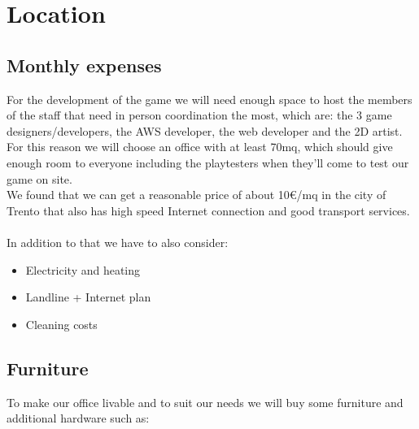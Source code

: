 \section{Location}
\label{section:location}

\subsection{Monthly expenses}
For the development of the game we will need enough space to host the members of the staff that need in person coordination the most, which are: the 3 game designers/developers, the AWS developer, the web developer and the 2D artist. For this reason we will choose an office with at least 70mq, which should give enough room to everyone including the playtesters when they'll come to test our game on site. \\
We found that we can get a reasonable price of about 10€/mq in the city of Trento that also has high speed Internet connection and good transport services. \\\\
In addition to that we have to also consider:
\begin{itemize}
	\item Electricity and heating
	\item Landline + Internet plan
	\item Cleaning costs
\end{itemize}


\subsection{Furniture}

To make our office livable and to suit our needs we will buy some furniture and additional hardware such as:

